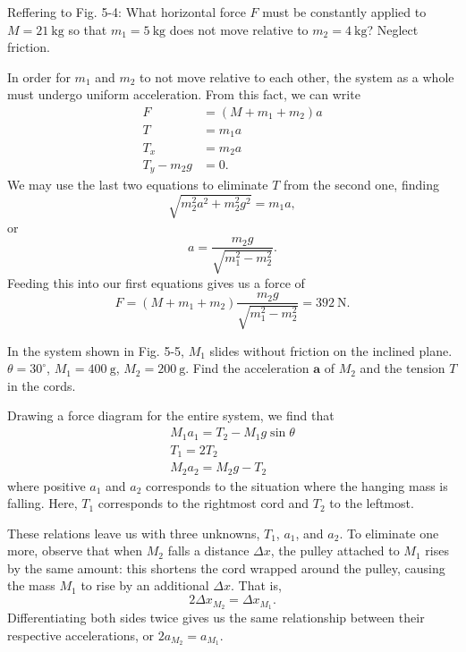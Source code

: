 \documentclass[../feynman-lectures-on-physics.tex]{subfiles}
\begin{document}
\begin{questions}
\question Reffering to Fig. 5-4: What horizontal force $F$ must be constantly
applied to $M = \SI{21}{\kilo\gram}$ so that $m_1=\SI{5}{\kilo\gram}$ does not
move relative to $m_2=\SI{4}{\kilo\gram}$? Neglect friction.

\begin{solution}
  In order for $m_1$ and $m_2$ to not move relative to each other, the system as
  a whole must undergo uniform acceleration. From this fact, we can write
  \begin{align*}
    F &= (M + m_1 + m_2)a \\
    T &= m_1a \\
    T_x &= m_2a \\
    T_y - m_2g &= 0.
  \end{align*}
  We may use the last two equations to eliminate $T$ from the second one,
  finding
  \[
    \sqrt{m_2^2a^2 + m_2^2g^2} = m_1a,
  \]
  or
  \[
    a = \frac{m_2g}{\sqrt{m_1^2-m_2^2}}.
  \]
  Feeding this into our first equations gives us a force of
  \[
    F = (M+m_1+m_2)\frac{m_2g}{\sqrt{m_1^2-m_2^2}} = \SI{392}{\newton}.
  \]
\end{solution}

\question In the system shown in Fig. 5-5, $M_1$ slides without friction on the
inclined plane. $\theta=30^\circ$, $M_1=\SI{400}{\gram}$, $M_2=\SI{200}{\gram}$.
Find the acceleration $\mathbf{a}$ of $M_2$ and the tension $T$ in the cords.

\begin{solution}
  Drawing a force diagram for the entire system, we find that
  \begin{gather*}
    M_1a_1 = T_2 - M_1g\sin\theta \\
    T_1 = 2T_2 \\
    M_2a_2 = M_2g - T_2
  \end{gather*}
  where positive $a_1$ and $a_2$ corresponds to the situation where the
  hanging mass is falling. Here, $T_1$ corresponds to the rightmost cord and
  $T_2$ to the leftmost.

  These relations leave us with three unknowns, $T_1$, $a_1$, and $a_2$. To
  eliminate one more, observe that when $M_2$ falls a distance $\Delta{x}$, the
  pulley attached to $M_1$ rises by the same amount: this shortens the cord
  wrapped around the pulley, causing the mass $M_1$ to rise by an additional
  $\Delta{x}$. That is,
  \[
    2\Delta{x}_{M_2} = \Delta{x}_{M_1}.
  \]
  Differentiating both sides twice gives us the same relationship between their
  respective accelerations, or $2a_{M_2}=a_{M_1}$.


\end{solution}
\end{questions}
\end{document}
